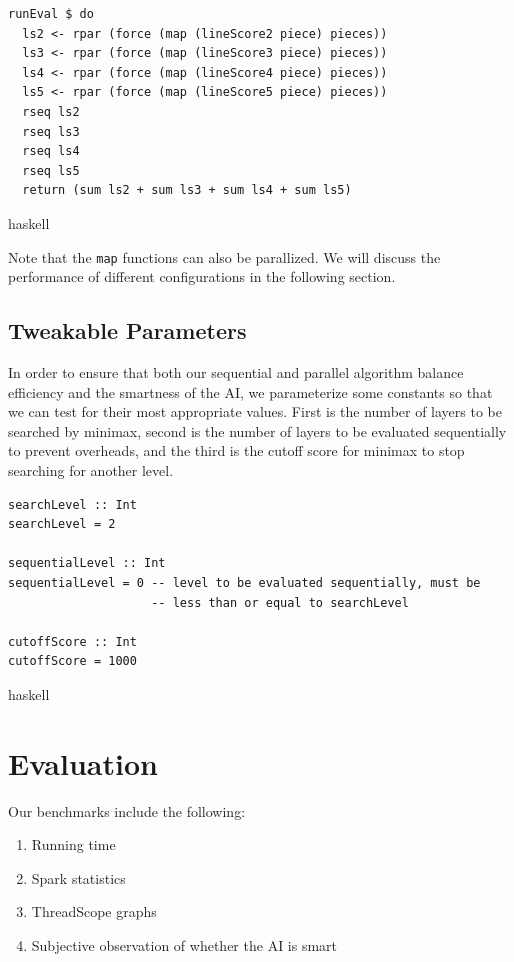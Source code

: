 \documentclass[twoside,11pt]{homework}
\begin{document}
\begin{verbatim}
runEval $ do
  ls2 <- rpar (force (map (lineScore2 piece) pieces))
  ls3 <- rpar (force (map (lineScore3 piece) pieces))
  ls4 <- rpar (force (map (lineScore4 piece) pieces))
  ls5 <- rpar (force (map (lineScore5 piece) pieces))
  rseq ls2
  rseq ls3
  rseq ls4
  rseq ls5
  return (sum ls2 + sum ls3 + sum ls4 + sum ls5)
\end{verbatim}{haskell}

Note that the \texttt{map} functions can also be parallized. We will discuss the performance of different configurations in the following section.

\subsection{Tweakable Parameters}
In order to ensure that both our sequential and parallel algorithm balance efficiency and the smartness of the AI, we parameterize some constants so that we can test for their most appropriate values. First is the number of layers to be searched by minimax, second is the number of layers to be evaluated sequentially to prevent overheads, and the third is the cutoff score for minimax to stop searching for another level.

\begin{verbatim}
searchLevel :: Int
searchLevel = 2

sequentialLevel :: Int
sequentialLevel = 0 -- level to be evaluated sequentially, must be
                    -- less than or equal to searchLevel

cutoffScore :: Int
cutoffScore = 1000
\end{verbatim}{haskell}


\section{Evaluation}
Our benchmarks include the following:
\begin{enumerate}
    \item Running time
    \item Spark statistics
    \item ThreadScope graphs
    \item Subjective observation of whether the AI is smart
\end{enumerate}
\end{document}
